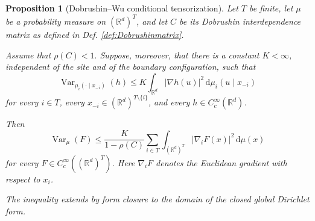 \documentclass[12pt,reqno,letterpaper]{amsart}
\newtheorem{proposition}[theorem]{Proposition}
\theoremstyle{definition}
\theoremstyle{remark}
\numberwithin{equation}{section}
\newcommand{\R}{\mathbb R}
\newcommand{\dd}{\,\mathrm d}
\newcommand{\Var}{\operatorname{Var}}
\begin{document}
\begin{proposition}[Dobrushin--Wu conditional tensorization]
\label{prop:wu-criterion}
Let \(T\) be finite, let \(\mu\) be a probability measure on
\((\R^d)^T\), and let \(C\) be its Dobrushin interdependence matrix as
defined in Def. \ref{def:Dobrushinmatrix}.

Assume that $\rho(C)<1.$
Suppose, moreover, that there is a constant \(K<\infty\), independent of
the site and of the boundary configuration, such that
\begin{equation}\label{eq:wu-conditional-PI}
 \Var_{\mu_i(\cdot\mid x_{-i})}(h)
 \le
 K\int_{\R^d}|\nabla h(u)|^2
 \dd\mu_i(u\mid x_{-i})
\end{equation}
for every \(i\in T\), every
\(x_{-i}\in(\R^d)^{T\setminus\{i\}}\), and every
\(h\in C_c^\infty(\R^d)\).

Then
\begin{equation}\label{eq:wu-gradient-PI}
 \Var_\mu(F)
 \le
 \frac{K}{1-\rho(C)}
 \sum_{i\in T}
 \int_{(\R^d)^T}|\nabla_iF(x)|^2\dd\mu(x)
\end{equation}
for every \(F\in C_c^\infty((\R^d)^T)\).  Here \(\nabla_iF\) denotes the
Euclidean gradient with respect to \(x_i\).

The inequality extends by form closure to the domain of the closed global
Dirichlet form.
\end{proposition}
\end{document}
